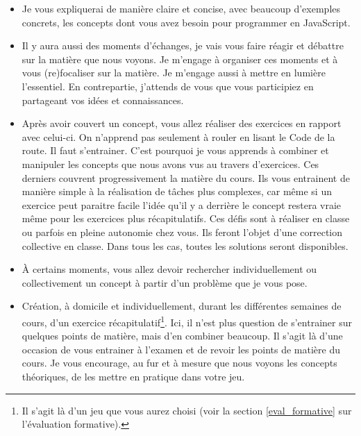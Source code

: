 \begin{itemize}
    \item Je vous expliquerai de manière claire et concise, avec beaucoup d’exemples concrets, les concepts dont vous avez besoin pour programmer en JavaScript.
    \item Il y aura aussi des moments d'échanges, je vais vous faire réagir et débattre sur la matière que nous voyons. Je m'engage à organiser ces moments et à vous (re)focaliser sur la matière. Je m'engage aussi à mettre en lumière l'essentiel. En contrepartie, j’attends de vous que vous participiez en partageant vos idées et connaissances.
    \item Après avoir couvert un concept, vous allez réaliser des exercices en rapport avec celui-ci. On n’apprend pas seulement à rouler en lisant le Code de la route. Il faut s'entrainer. C'est pourquoi je vous apprends à combiner et manipuler les concepts que nous avons vus au travers d’exercices. Ces derniers couvrent progressivement la matière du cours. Ils vous entrainent de manière simple à la réalisation de tâches plus complexes, car même si un exercice peut paraitre facile l'idée qu'il y a derrière le concept restera vraie même pour les exercices plus récapitulatifs. Ces défis sont à réaliser en classe ou parfois en pleine autonomie chez vous. Ils feront l'objet d'une correction collective en classe. Dans tous les cas, toutes les solutions seront disponibles.
    \item À certains moments, vous allez devoir rechercher individuellement ou collectivement un concept à partir d'un problème que je vous pose.
    \item Création, à domicile et individuellement, durant les différentes semaines de cours, d'un exercice récapitulatif\footnote{Il s’agit là d’un jeu que vous aurez choisi (voir la section \ref{eval_formative} sur l’évaluation formative).}. Ici, il n'est plus question de s'entrainer sur quelques points de matière, mais d'en combiner beaucoup. Il s’agit là d’une occasion de vous entrainer à l’examen et de revoir les points de matière du cours. Je vous encourage, au fur et à mesure que nous voyons les concepts théoriques, de les mettre en pratique dans votre jeu.\\
\end{itemize}

